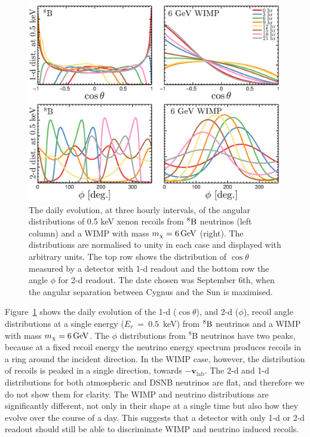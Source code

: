 \begin{figure}
\begin{center}
\includegraphics[trim = 0mm 0 0mm 0mm, clip, width=0.99\textwidth]{Figures/Daily_1D2D_evolution.eps}
\caption[Daily evolution of recoils from ${}^{8}\rm{B}$ neutrinos and WIMPs]{The daily evolution, at three hourly intervals, of the angular distributions of 0.5 keV xenon recoils from
${}^{8}\rm{B}$ neutrinos (left column) and a WIMP with mass $m_{\chi} = 6 \, {\rm GeV}$ (right). The distributions are normalised to unity in each case and displayed with arbitrary units. The top row shows the distribution of $\cos{\theta}$  measured by a detector with 1-d readout and the bottom row the angle $\phi$  for  2-d readout. The date chosen was September 6th, when the angular separation between Cygnus and the Sun is maximised.} 
\label{fig:daily1d2d}
\end{center}
\end{figure} 
Figure~\ref{fig:daily1d2d} shows the daily evolution of the 1-d ($\cos{\theta}$), and 2-d ($\phi$), recoil angle distributions at a single energy ($E_r~=~0.5$~keV) from ${}^{8}\rm{B}$ neutrinos and a WIMP with mass $m_{\chi} = 6 \, {\rm GeV}$. The $\phi$ distributions from $^8$B neutrinos have two peaks, because at a fixed recoil energy the neutrino energy spectrum produces recoils in a ring around the incident direction. In the WIMP case, however, the distribution of recoils is peaked in a single direction, towards $-\textbf{v}_\textrm{lab}$. The 2-d and 1-d distributions for both atmospheric and DSNB neutrinos are flat, and therefore we do not show them for clarity. The WIMP and neutrino distributions are significantly different, not only in their shape at a single time but also how they evolve over the course of a day. This suggests that a detector with only 1-d or 2-d readout should still be able to discriminate WIMP and neutrino induced recoils.


